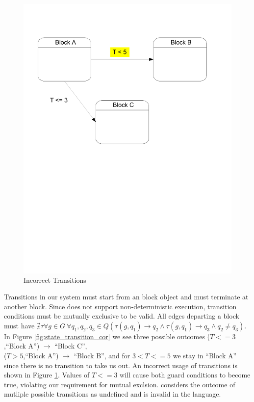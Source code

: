 \begin{figure}[htp]
    \centering
    \includegraphics[trim= 10mm 130mm 20mm 10mm, clip, width=\imgmedphoto]{./images/state_transition_bad.pdf}
    \caption{Incorrect Transitions}
    \label{fig:state_transition_bad}
\end{figure}

Transitions in our system must start from an block object and must terminate at another block. Since \emphasize{\plcchart} does not support non-deterministic execution, transition conditions must be mutually exclusive to be valid. All edges departing a block must have ${\nexists{\tau} \forall{g \in G} \: \forall{q_1, q_2, q_3\in Q}} {({\tau(g,q_1) \rightarrow q_2} \wedge {\tau(g,q_1) \rightarrow q_3} \wedge {q_2 \neq q_3})}$. In Figure \ref{fig:state_transition_cor} we see three possible outcomes ($T<=3$,``Block A'') $\rightarrow$ ``Block C'',  \\
($T>5$,``Block A'') $\rightarrow$ ``Block B'', and for $3 < T <= 5$ we stay in ``Block A'' since there is no transition to take us out. An incorrect usage of transitions is shown in Figure \ref{fig:state_transition_bad}. Values of $T <= 3$ will cause both guard conditions to become true, violating our requirement for mutual exclsion. \emphasize{\plcchart} considers the outcome of mutliple possible transitions as undefined and is invalid in the language.
